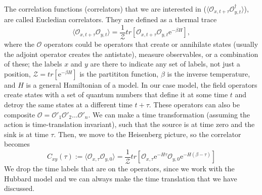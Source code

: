 The correlation functions (correlators) that we are interested in ($\langle \mathcal{O}_{x,t+\tau}\mathcal{O}^\dagger_{y,t} \rangle$), are called Eucledian correlators. They are defined as a thermal trace
\begin{equation}
    \langle \mathcal{O}_{x,t+\tau}\mathcal{O}_{y,t} \rangle = \frac{1}{\mathcal{Z}}tr\left[ \mathcal{O}_{x,t+\tau}\mathcal{O}_{y,t}\mathrm{e}^{-\beta H} \right],
\end{equation}
where the $\mathcal{O}$ operators could be operators that create or annihilate states (usually the adjoint operator creates the antistate), measure observables, or a combination of these; the labels $x$ and $y$ are there to indicate any set of labels, not just a position, $\mathcal{Z} = tr\left[ \mathrm{e}^{-\beta H} \right]$ is the partititon function, $\beta$ is the inverse temperature, and $H$ is a general Hamiltonian of a model. In our case model, the field operators create states with a set of quantum numbers that define it at some time $t$ and detroy the same states at a different time $t + \tau$. These operators can also be composite $\mathcal{O} = \mathcal{O'}_1\mathcal{O'}_2\hdots\mathcal{O'}_n$. We can make a time transformation (assuming the action is time-translation invariant), such that the source is at time zero and the sink is at time $\tau$. Then, we move to the Heisenberg picture, so the correlator becomes
\begin{equation}
    C_{xy}(\tau) := \langle \mathcal{O}_{x,\tau}\mathcal{O}_{y,0} \rangle = \frac{1}{\mathcal{Z}}tr\left[ \mathcal{O}_{x,\tau}\mathrm{e}^{-H\tau}\mathcal{O}_{y,0}\mathrm{e}^{-H(\beta - \tau)} \right]
\end{equation}
We drop the time labels that are on the operators, since we work with the Hubbard model and we can always make the time translation that we have discussed.

